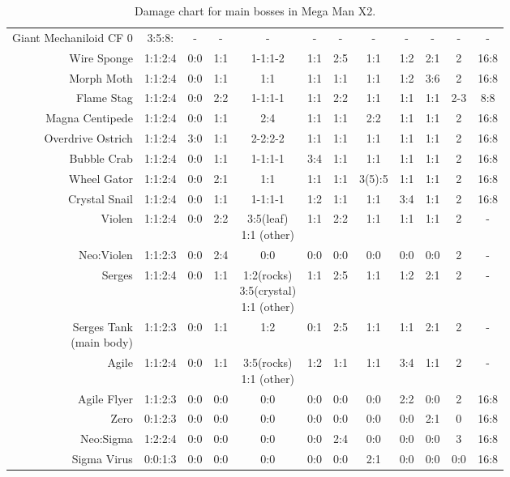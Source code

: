 \begin{table}[htp]
{\begin{tabular}{r *{11}{c}}
			\midrule
\small{Giant Mechaniloid CF 0} & 3:5:8:	&- 	&- 	&-	&-	&- 	&- 	&- 	 &-	&- 	&- \\
			Wire Sponge 	    & 1:1:2:4   &0:0&1:1&1-1:1-2&1:1&2:5&1:1&1:2&2:1& 2  &16:8\\
			Morph Moth			& 1:1:2:4	&0:0&1:1&1:1  &1:1&1:1&1:1&1:2&3:6& 2	  &16:8\\
			Flame Stag			  & 1:1:2:4	&0:0&2:2&1-1:1-1	&1:1&2:2&1:1&1:1&1:1& 2-3 &8:8\\
			Magna Centipede		  & 1:1:2:4	&0:0&1:1&2:4 		&1:1&1:1&2:2&1:1&1:1& 2   &16:8\\
			Overdrive Ostrich	  & 1:1:2:4 &3:0&1:1&2-2:2-2    &1:1&1:1&1:1&1:1&1:1&2    &16:8 \\
			Bubble Crab			  & 1:1:2:4 &0:0&1:1&1-1:1-1    &3:4&1:1&1:1&1:1&1:1&2 	  &16:8 \\
			Wheel Gator			  & 1:1:2:4	&0:0&2:1&1:1        &1:1&1:1&3(5)\footnotemark:5&1:1&1:1&2&16:8 \\
			Crystal Snail		  & 1:1:2:4	&0:0&1:1&1-1:1-1	&1:2&1:1&1:1&3:4&1:1&2 	&16:8 \\
			Violen				  & 1:1:2:4 &0:0&2:2&\makecell[ct]{3:5(leaf)\\1:1 (other)}&1:1&2:2&1:1&1:1&1:1&2&-\\
			Neo:Violen		  & 1:1:2:3 &0:0&2:4&0:0&0:0&0:0&0:0&0:0&0:0&2&-\\
			Serges&1:1:2:4	  & 0:0	&1:1&\makecell[ct]{1:2(rocks)\\3:5(crystal)\\1:1 (other)} 	& 1:1	&2:5&1:1&1:2&2:1&2 	&- \\
			\makecell[rt]{Serges Tank\\(main body)}&1:1:2:3	&0:0&1:1&1:2&0:1&2:5&1:1&1:1&2:1&2 	&- \\
			Agile& 		1:1:2:4&0:0	&1:1&\makecell[ct]{3:5(rocks)\\1:1 (other)} 	&1:2 		&1:1 	&1:1 	&3:4 	&1:1 		&2 	&-\\
			Agile Flyer&1:1:2:3	&0:0&0:0&0:0&0:0&0:0&0:0&2:2&0:0&2 	&16:8 \\
			Zero&0:1:2:3&0:0&0:0&0:0&0:0&0:0&0:0&0:0&2:1&0&16:8\\
			Neo:Sigma& 1:2:2:4&0:0&0:0&0:0&0:0&2:4&0:0&0:0&0:0&3&16:8 \\
			Sigma Virus& 0:0:1:3&0:0&0:0&0:0&0:0&0:0&2:1&0:0&0:0&0:0&16:8\\
			\bottomrule
		\end{tabular}
	}	
	\caption{Damage chart for main bosses in Mega Man X2.}
\end{table}

